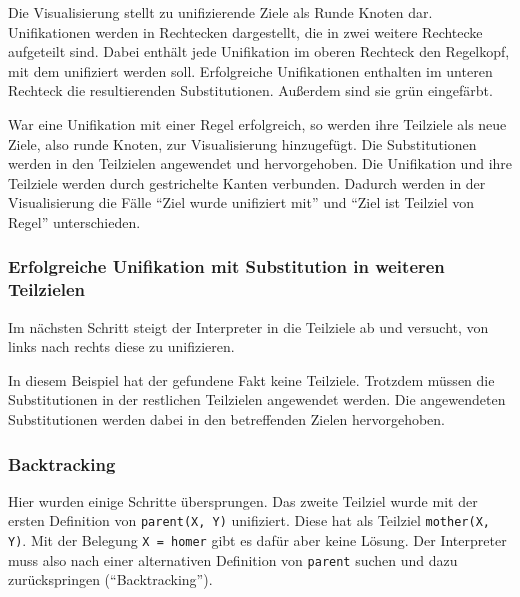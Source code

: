 \documentclass[parskip=full,11pt,twoside]{scrartcl}
\begin{document}
Die Visualisierung stellt zu unifizierende Ziele als Runde Knoten dar.
Unifikationen werden in  Rechtecken dargestellt, die in zwei weitere Rechtecke aufgeteilt sind.
Dabei enthält jede Unifikation im oberen Rechteck den Regelkopf, mit dem unifiziert werden soll.
Erfolgreiche Unifikationen enthalten im unteren Rechteck die resultierenden Substitutionen.
Außerdem sind sie grün eingefärbt.

War eine Unifikation mit einer Regel erfolgreich, so werden ihre Teilziele als neue Ziele, also runde Knoten, zur Visualisierung hinzugefügt.
Die Substitutionen werden in den Teilzielen angewendet und hervorgehoben.
Die Unifikation und ihre Teilziele werden durch gestrichelte Kanten verbunden.
Dadurch werden in der Visualisierung die Fälle \enquote{Ziel wurde unifiziert mit} und \enquote{Ziel ist Teilziel von Regel} unterschieden.

\subsubsection{Erfolgreiche Unifikation mit Substitution in weiteren Teilzielen}

Im nächsten Schritt steigt der Interpreter in die Teilziele ab und versucht, von links nach rechts diese zu unifizieren.

\begin{minipage}{\linewidth}
\end{minipage}

In diesem Beispiel hat der gefundene Fakt keine Teilziele.
Trotzdem müssen die Substitutionen in der restlichen Teilzielen angewendet werden.
Die angewendeten Substitutionen werden dabei in den betreffenden Zielen hervorgehoben.

\subsubsection{Backtracking}

Hier wurden einige Schritte übersprungen.
Das zweite Teilziel wurde mit der ersten Definition von \texttt{parent(X, Y)} unifiziert.
Diese hat als Teilziel \texttt{mother(X, Y)}.
Mit der Belegung \texttt{X = homer} gibt es dafür aber keine Lösung.
Der Interpreter muss also nach einer alternativen Definition von \texttt{parent} suchen und dazu zurückspringen (\enquote{Backtracking}).
\end{document}
